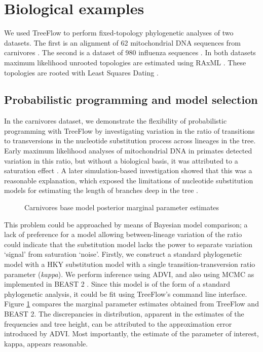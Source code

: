 \section{Biological examples}

We used TreeFlow to perform fixed-topology phylogenetic analyses of two datasets. The first is an alignment of 62 mitochondrial DNA sequences from carnivores \cite{suchard2009many}. The second is a dataset of 980 influenza sequences \cite{vaughan2014efficient}. In both datasets maximum likelihood unrooted topologies are estimated using RAxML \cite{stamatakis2014raxml}. These topologies are rooted with Least Squares Dating \cite{to2016lsd}.

\subsection{Probabilistic programming and model selection}

In the carnivores dataset, we demonstrate the flexibility of probabilistic programming with TreeFlow by investigating variation in the ratio of transitions to transversions in the nucleotide substitution process across lineages in the tree. Early maximum likelihood analyses of mitochondrial DNA in primates detected variation in this ratio, but without a biological basis, it was attributed to a saturation effect \cite{yang1999estimation}. A later simulation-based investigation showed that this was a reasonable explanation, which exposed the limitations of nucleotide substitution models for estimating the length of branches deep in the tree \cite{duchene2015declining}.

\begin{figure}
    \centering
    \caption{Carnivores base model posterior marginal parameter estimates}
    \label{fig:carnivoresmarginals}
\end{figure}

This problem could be approached by means of Bayesian model comparison; a lack of preference for a model allowing between-lineage variation of the ratio could indicate that the substitution model lacks the power to separate variation `signal' from saturation `noise'. Firstly, we construct a standard phylogenetic model with a HKY substitution model with a single transition-transversion ratio parameter (\textit{kappa}). We perform inference using ADVI, and also using MCMC as implemented in BEAST 2 \cite{bouckaert2019beast}. Since this model is of the form of a standard phylogenetic analysis, it could be fit using TreeFlow's command line interface. Figure \ref{fig:carnivoresmarginals} compares the marginal parameter estimates obtained from TreeFlow and BEAST 2. The discrepancies in distribution, apparent in the estimates of the frequencies and tree height, can be attributed to the approximation error introduced by ADVI. Most importantly, the estimate of the parameter of interest, kappa, appears reasonable.

